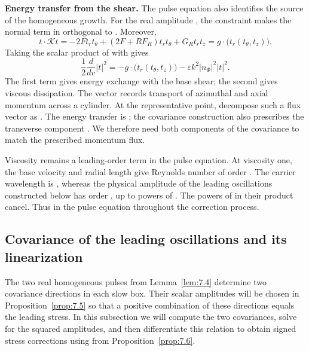 \textbf{Energy transfer from the shear.}
The pulse equation also identifies the source of the homogeneous growth. For
the real amplitude , the constraint
 makes the normal term in
 orthogonal to .
Moreover,
\[
  t\cdot\mathcal Kt=-2F t_rt_\theta+(2F+RF_R)t_rt_\theta+G_Rt_rt_z
  =g\cdot\bigl(t_r(t_\theta,t_z)\bigr).
\]
Taking the scalar product of
 with  gives
\begin{equation}
  \frac12\frac{d}{dv}|t|^2
  =-g\cdot\bigl(t_r(t_\theta,t_z)\bigr)
  -\varepsilon k^2|n_\Phi|^2|t|^2.
  \tag{7.22}\label{eq:7.22}
\end{equation}
The first term gives energy exchange with the base shear; the second gives
viscous dissipation. The vector
 records transport of azimuthal and
axial momentum across a cylinder. At the representative point, decompose such
a flux vector as . The energy transfer is
; the covariance construction also
prescribes the transverse component . We therefore
need both components of the covariance to match the prescribed momentum flux.

Viscosity remains a leading-order term in the pulse equation. At viscosity
one, the base velocity and radial length give Reynolds number of order
. The carrier wavelength is
, whereas the physical
amplitude of the leading oscillations constructed below has order
, up to powers of
. The powers of  in their
product cancel. Thus  in the pulse
equation throughout the correction process.

\subsection{Covariance of the leading oscillations and its linearization}
\label{sec:7.3}
The two real homogeneous pulses  from
Lemma~\ref{lem:7.4} determine two covariance directions in each slow box.
Their scalar amplitudes  will be chosen in
Proposition~\ref{prop:7.5} so that a positive combination of these directions
equals the leading stress. In this subsection we will compute the two
covariances, solve for the squared amplitudes, and then differentiate this
relation to obtain signed stress corrections using
 from Proposition~\ref{prop:7.6}.

